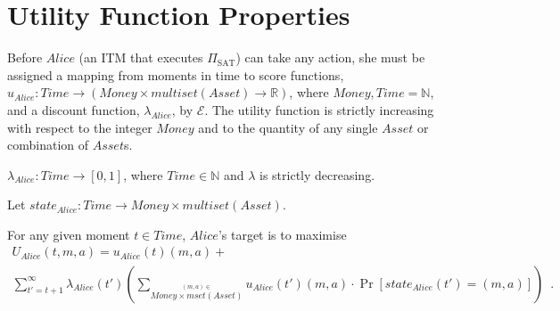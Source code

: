 \section{Utility Function Properties}
  Before $Alice$ (an ITM that executes $\Pi_{\mathrm{SAT}}$) can take any action, she must
  be assigned a mapping from moments in time to score functions, $u_{Alice} : Time
  \rightarrow \left(Money \times multiset\left(Asset\right) \rightarrow
  \mathbb{R}\right)$, where $Money, Time = \mathbb{N}$, and a discount function,
  $\lambda_{Alice}$, by $\mathcal{E}$. The utility function is strictly increasing with
  respect to the integer $Money$ and to the quantity of any single $Asset$ or combination
  of $Asset$s.

  \begin{definition}
    $\lambda_{Alice} : Time \rightarrow \left[0, 1\right]$, where $Time \in \mathbb{N}$
    and $\lambda$ is strictly decreasing.
  \end{definition}
  \begin{definition}[State]
  Let $state_{Alice} : Time \rightarrow Money \times multiset\left(Asset\right)$.
  \end{definition}
  For any given moment $t \in Time$, $Alice$'s target is to maximise
  \begin{gather*}
    U_{Alice}\left(t, m, a\right) = u_{Alice}\left(t\right)\left(m, a\right) + \\
    \sum\limits_{t' = t + 1}^{\infty}
    \lambda_{Alice}\left(t'\right)\left(\sum\limits_{\overset{\left(m, a\right) \in}{Money
    \times mset\left(Asset\right)}} u_{Alice}\left(t'\right)\left(m, a\right) \cdot
    \Pr\left[state_{Alice}\left(t'\right) = \left(m, a\right)\right]\right) \enspace.
  \end{gather*}
